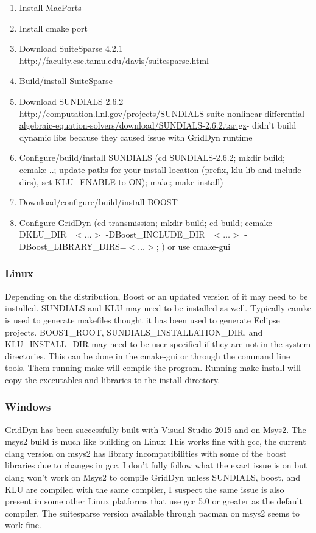 \documentclass[12pt]{article} %
\begin{document}
\begin{enumerate}
\item Install MacPorts
\item Install cmake port
\item Download SuiteSparse 4.2.1 \url{http://faculty.cse.tamu.edu/davis/suitesparse.html}
\item Build/install SuiteSparse
\item Download SUNDIALS 2.6.2 \url{http://computation.llnl.gov/projects/SUNDIALS-suite-nonlinear-differential-algebraic-equation-solvers/download/SUNDIALS-2.6.2.tar.gz}- didn't build dynamic libs because they caused issue with GridDyn runtime
\item Configure/build/install SUNDIALS (cd SUNDIALS-2.6.2; mkdir build; ccmake ..; update paths for your install location (prefix, klu lib and include dirs), set KLU\_ENABLE to ON); make; make install)
\item Download/configure/build/install BOOST
\item Configure GridDyn (cd transmission; mkdir build; cd build; ccmake -DKLU\_DIR=$<\hdots>$ -DBoost\_INCLUDE\_DIR=$<\hdots>$ -DBoost\_LIBRARY\_DIRS=$<\hdots>$; ) or use cmake-gui
\end{enumerate}

\subsubsection{Linux}
Depending on the distribution, Boost or an updated version of it may need to be installed.  SUNDIALS and KLU may need to be installed as well.  Typically camke is used to generate makefiles thought it has been used to generate Eclipse projects.    BOOST\_ROOT, SUNDIALS\_INSTALLATION\_DIR, and KLU\_INSTALL\_DIR may need to be user specified if they are not in the system directories.  This can be done in the cmake-gui or through the command line tools.  Them running make will compile the program.
Running make install will copy the executables and libraries to the install directory.

\subsubsection{Windows}
GridDyn has been successfully built with Visual Studio 2015 and on Msys2.  The msys2 build is much like building on Linux  This works fine with gcc,  the current clang version on msys2 has library incompatibilities with some of the boost libraries due to changes in gcc.  I don't fully follow what the exact issue is on but clang won't work on Msys2 to compile GridDyn unless SUNDIALS, boost, and KLU are compiled with the same compiler, I suspect the same issue is also present in some other Linux platforms that use gcc 5.0 or greater as the default compiler.  The suitesparse version available through pacman on msys2 seems to work fine.
\end{document}
